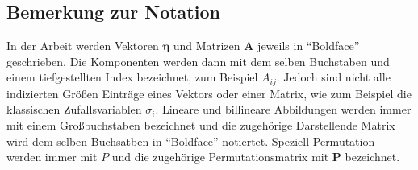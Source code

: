 \subsection{Bemerkung zur Notation}
In der Arbeit werden Vektoren $\bm{\eta}$ und Matrizen $\bm{A}$ jeweils in ``Boldface''  geschrieben. Die Komponenten werden dann mit dem selben Buchstaben und einem tiefgestellten Index bezeichnet, zum Beispiel $A_{ij}$. Jedoch sind nicht alle indizierten Größen Einträge eines Vektors oder einer Matrix, wie zum Beispiel die klassischen Zufallsvariablen $\sigma_i$.
Lineare und billineare Abbildungen werden immer mit einem Großbuchstaben bezeichnet und die zugehörige Darstellende Matrix wird dem selben Buchsatben in ``Boldface'' notiertet. Speziell Permutation werden immer mit $P$ und die zugehörige Permutationsmatrix mit $\bm{P}$ bezeichnet. 
